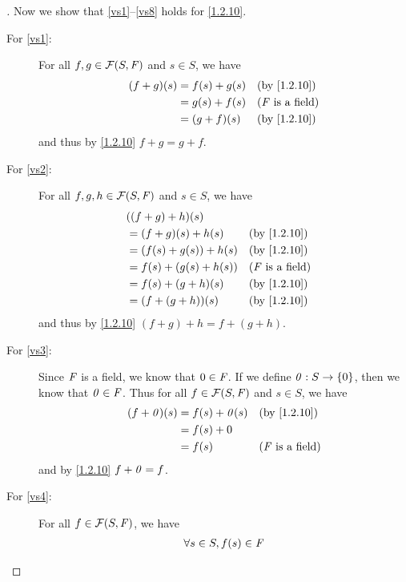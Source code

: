 \begin{proof}[]
  Now we show that \ref{vs1}--\ref{vs8} holds for \cref{1.2.10}.
  \begin{description}
    \item[For \ref{vs1}:]
      For all \(f, g \in \mathcal{F}(S, \mathit{F})\) and \(s \in S\), we have
      \begin{align*}
        (f + g)(s) & = f(s) + g(s) &  & \by{1.2.10}                \\
                   & = g(s) + f(s) &  & \text{(\(\F\) is a field)} \\
                   & = (g + f)(s)  &  & \by{1.2.10}
      \end{align*}
      and thus by \cref{1.2.10} \(f + g = g + f\).
    \item[For \ref{vs2}:]
      For all \(f, g, h \in \mathcal{F}(S, \mathit{F})\) and \(s \in S\), we have
      \begin{align*}
         & ((f + g) + h)(s)                                       \\
         & = (f + g)(s) + h(s)    &  & \by{1.2.10}                \\
         & = (f(s) + g(s)) + h(s) &  & \by{1.2.10}                \\
         & = f(s) + (g(s) + h(s)) &  & \text{(\(\F\) is a field)} \\
         & = f(s) + (g + h)(s)    &  & \by{1.2.10}                \\
         & = (f + (g + h))(s)     &  & \by{1.2.10}
      \end{align*}
      and thus by \cref{1.2.10} \((f + g) + h = f + (g + h)\).
    \item[For \ref{vs3}:]
      Since \(\mathit{F}\) is a field, we know that \(0 \in \mathit{F}\).
      If we define \(\mathit{0} : S \to \{0\}\), then we know that \(\mathit{0} \in \mathit{F}\).
      Thus for all \(f \in \mathcal{F}(S, \mathit{F})\) and \(s \in S\), we have
      \begin{align*}
        (f + \zv)(s) & = f(s) + \zv(s) &  & \by{1.2.10}                \\
                     & = f(s) + 0                                      \\
                     & = f(s)          &  & \text{(\(\F\) is a field)}
      \end{align*}
      and by \cref{1.2.10} \(f + \mathit{0} = f\).
    \item[For \ref{vs4}:]
      For all \(f \in \mathcal{F}(S, \mathit{F})\), we have
      \begin{align*}
                 & \forall s \in S, f(s) \in \F                                                          \\

\end{align*}
\end{description}
\end{proof}
